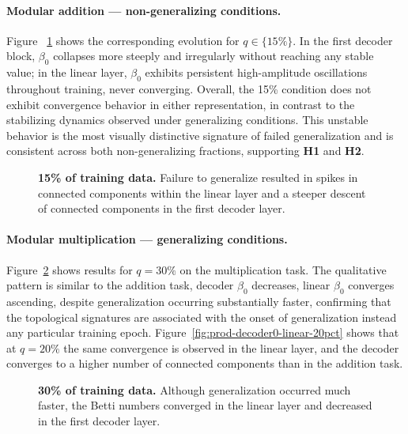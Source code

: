 \paragraph{Modular addition — non-generalizing conditions.}
Figure ~\ref{fig:sum-decoder0-linear-15pct} shows the corresponding evolution for $q \in \{15\%\}$. In the first decoder block, $\beta_0$ collapses more steeply and irregularly without reaching any stable value; in the linear layer, $\beta_0$ exhibits persistent high-amplitude oscillations throughout training, never converging. Overall, the 15\% condition does not exhibit convergence behavior in either representation, in contrast to the stabilizing dynamics observed under generalizing conditions. This unstable behavior is the most visually distinctive signature of failed generalization and is consistent across both non-generalizing fractions, supporting \textbf{H1} and \textbf{H2}.

\begin{figure}
    
    
    \caption[15\% of training data.]{\textbf{15\% of training data.} Failure to generalize resulted in spikes in connected components within the linear layer and a steeper descent of connected components in the first decoder layer.}
    \label{fig:sum-decoder0-linear-15pct}
\end{figure}


\paragraph{Modular multiplication — generalizing conditions.}
Figure~\ref{fig:prod-decoder0-linear-30pct} shows results for $q = 30\%$ on the multiplication task. The qualitative pattern is similar to the addition task,  decoder $\beta_0$ decreases, linear $\beta_0$ converges ascending, despite generalization occurring substantially faster, confirming that the topological signatures are associated with the onset of generalization instead any particular training epoch. Figure~\ref{fig:prod-decoder0-linear-20pct} shows that at $q = 20\%$ the same convergence is observed in the linear layer, and the decoder converges to a higher number of connected components than in the addition task.

\begin{figure}
    \centering
    
    
    \caption[30\% of training data (Modular Product).]{\textbf{30\% of training data.} Although generalization occurred much faster, the Betti numbers converged in the linear layer and decreased in the first decoder layer.}
    \label{fig:prod-decoder0-linear-30pct}
\end{figure}

